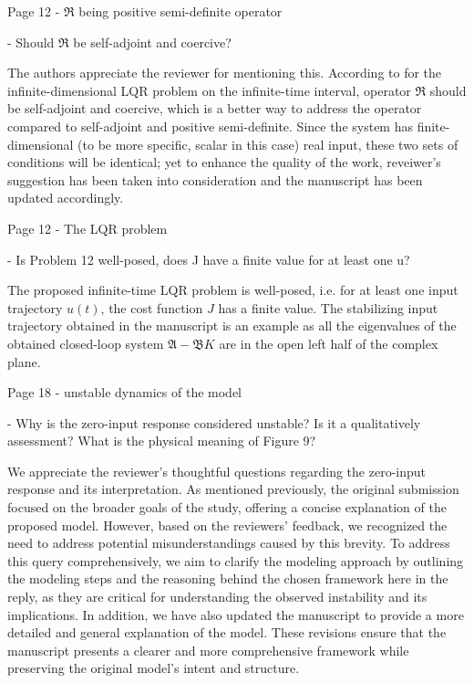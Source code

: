 \documentclass[11pt,answers]{exam}
\begin{document}
\begin{questions}
    \question Page 12 - $\mathfrak{R}$ being positive semi-definite operator

    - Should $\mathfrak{R}$ be self-adjoint and coercive?

    \begin{solutionorbox} \label{comment:1_9}
        The authors appreciate the reviewer for mentioning this. According to \cite{curtainbook} for the infinite-dimensional LQR problem on the infinite-time interval, operator $\mathfrak{R}$ should be self-adjoint and coercive, which is a better way to address the operator compared to self-adjoint and positive semi-definite. Since the system has finite-dimensional (to be more specific, scalar in this case) real input, these two sets of conditions will be identical; yet to enhance the quality of the work, reveiwer's suggestion has been taken into consideration and the manuscript has been updated accordingly.
    \end{solutionorbox}


    \question Page 12 - The LQR problem

    - Is Problem 12 well-posed, does J have a finite value for at least one u?

    \begin{solutionorbox} \label{comment:1_10}
        The proposed infinite-time LQR problem is well-posed, i.e. for at least one input trajectory $u(t)$, the cost function $J$ has a finite value. The stabilizing input trajectory obtained in the manuscript is an example as all the eigenvalues of the obtained closed-loop system $\mathfrak{A} - \mathfrak{B} K$ are in the open left half of the complex plane. 
    \end{solutionorbox}


    \question Page 18 - unstable dynamics of the model

    - Why is the zero-input response considered unstable? Is it a qualitatively assessment? What is the physical meaning of Figure 9?

    \begin{solutionorbox} \label{comment:1_11}
        We appreciate the reviewer’s thoughtful questions regarding the zero-input response and its interpretation. As mentioned previously, the original submission focused on the broader goals of the study, offering a concise explanation of the proposed model. However, based on the reviewers’ feedback, we recognized the need to address potential misunderstandings caused by this brevity. To address this query comprehensively, we aim to clarify the modeling approach by outlining the modeling steps and the reasoning behind the chosen framework here in the reply, as they are critical for understanding the observed instability and its implications. In addition, we have also updated the manuscript to provide a more detailed and general explanation of the model. These revisions ensure that the manuscript presents a clearer and more comprehensive framework while preserving the original model’s intent and structure.
        

\end{solutionorbox}
\end{questions}
\end{document}
